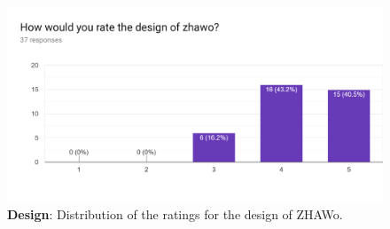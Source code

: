 \begin{markdown}
\begin{figure}[H]
  \includegraphics[width=13cm, center]{./figures/bar_3.png}
  \captionsetup{width=15.5cm}
  \caption [Design survey results]{\textbf{Design}: Distribution of the ratings for the design of ZHAWo.}
  \label{fig:BarDesign}
\end{figure}

\end{markdown}